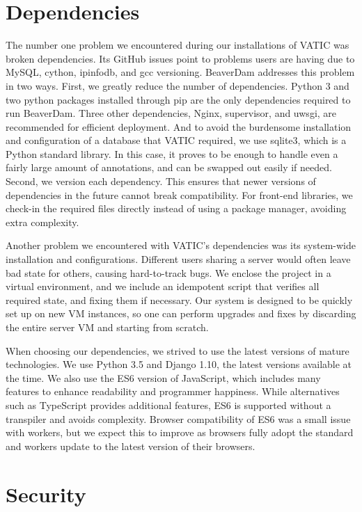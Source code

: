 \section{Dependencies}

The number one problem we encountered during our installations of VATIC was broken dependencies.
Its GitHub issues point to problems users are having due to MySQL, cython, ipinfodb, and gcc versioning.
BeaverDam addresses this problem in two ways.
First, we greatly reduce the number of dependencies.
Python 3 and two python packages installed through pip are the only dependencies required to run BeaverDam.
Three other dependencies, Nginx, supervisor, and uwsgi, are recommended for efficient deployment.
And to avoid the burdensome installation and configuration of a database that VATIC required, we use sqlite3, which is a Python standard library.
In this case, it proves to be enough to handle even a fairly large amount of annotations, and can be swapped out easily if needed.
Second, we version each dependency.
This ensures that newer versions of dependencies in the future cannot break compatibility.
For front-end libraries, we check-in the required files directly instead of using a package manager, avoiding extra complexity.

Another problem we encountered with VATIC's dependencies was its system-wide installation and configurations.
Different users sharing a server would often leave bad state for others, causing hard-to-track bugs.
We enclose the project in a virtual environment, and we include an idempotent script that verifies all required state, and fixing them if necessary.
Our system is designed to be quickly set up on new VM instances,
so one can perform upgrades and fixes by discarding the entire server VM and starting from scratch.

When choosing our dependencies, we strived to use the latest versions of mature technologies.
We use Python 3.5 and Django 1.10, the latest versions available at the time.
We also use the ES6 version of JavaScript, which includes many features to enhance readability and programmer happiness.
While alternatives such as TypeScript provides additional features, ES6 is supported without a transpiler and avoids complexity.
Browser compatibility of ES6 was a small issue with workers, but we expect this to improve as browsers fully adopt the standard and workers update to the latest version of their browsers.

\section{Security}

